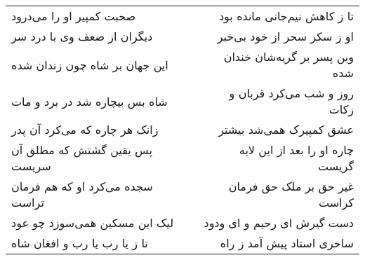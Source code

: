 \begin{center}
\begin{longtable}{l p{0.5cm} r}
\\
صحبت کمپیر او را می‌درود
&&
تا ز کاهش نیم‌جانی مانده بود
\\
دیگران از ضعف وی با درد سر
&&
او ز سکر سحر از خود بی‌خبر
\\
این جهان بر شاه چون زندان شده
&&
وین پسر بر گریه‌شان خندان شده
\\
شاه بس بیچاره شد در برد و مات
&&
روز و شب می‌کرد قربان و زکات
\\
زانک هر چاره که می‌کرد آن پدر
&&
عشق کمپیرک همی‌شد بیشتر
\\
پس یقین گشتش که مطلق آن سریست
&&
چاره او را بعد از این لابه گریست
\\
سجده می‌کرد او که هم فرمان تراست
&&
غیر حق بر ملک حق فرمان کراست
\\
لیک این مسکین همی‌سوزد چو عود
&&
دست گیرش ای رحیم و ای ودود
\\
تا ز یا رب یا رب و افغان شاه
&&
ساحری استاد پیش آمد ز راه
\\
\end{longtable}
\end{center}
